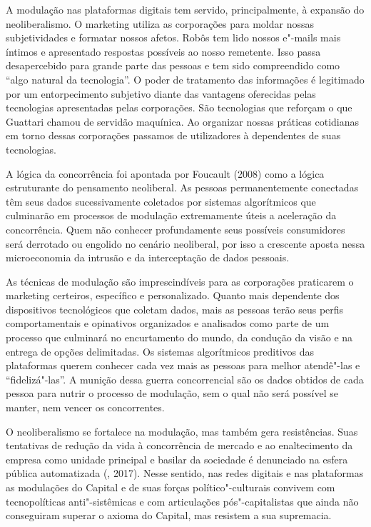 A modulação nas plataformas digitais tem servido, principalmente, à
expansão do neoliberalismo. O marketing utiliza as corporações para
moldar nossas subjetividades e formatar nossos afetos. Robôs tem lido
nossos e"-mails mais íntimos e apresentado respostas possíveis ao nosso
remetente. Isso passa desapercebido para grande parte das pessoas e tem
sido compreendido como ``algo natural da tecnologia''. O poder de
tratamento das informações é legitimado por um entorpecimento subjetivo
diante das vantagens oferecidas pelas tecnologias apresentadas pelas
corporações. São tecnologias que reforçam o que Guattari chamou de
servidão maquínica. Ao organizar nossas práticas cotidianas em torno
dessas corporações passamos de utilizadores à dependentes de suas
tecnologias.

A lógica da concorrência foi apontada por Foucault (2008) como a lógica
estruturante do pensamento neoliberal. As pessoas permanentemente
conectadas têm seus dados sucessivamente coletados por sistemas
algorítmicos que culminarão em processos de modulação extremamente úteis
a aceleração da concorrência. Quem não conhecer profundamente seus
possíveis consumidores será derrotado ou engolido no cenário neoliberal,
por isso a crescente aposta nessa microeconomia da intrusão e da
interceptação de dados pessoais.

As técnicas de modulação são imprescindíveis para as corporações
praticarem o marketing certeiros, específico e personalizado. Quanto
mais dependente dos dispositivos tecnológicos que coletam dados, mais as
pessoas terão seus perfis comportamentais e opinativos organizados e
analisados como parte de um processo que culminará no encurtamento do
mundo, da condução da visão e na entrega de opções delimitadas. Os
sistemas algorítmicos preditivos das plataformas querem conhecer cada
vez mais as pessoas para melhor atendê"-las e ``fidelizá"-las''. A munição
dessa guerra concorrencial são os dados obtidos de cada pessoa para
nutrir o processo de modulação, sem o qual não será possível se manter,
nem vencer os concorrentes.

O neoliberalismo se fortalece na modulação, mas também gera
resistências. Suas tentativas de redução da vida à concorrência de
mercado e ao enaltecimento da empresa como unidade principal e basilar
da sociedade é denunciado na esfera pública automatizada (,
2017). Nesse sentido, nas redes digitais e nas plataformas as modulações
do Capital e de suas forças político"-culturais convivem com
tecnopolíticas anti"-sistêmicas e com articulações pós"-capitalistas que
ainda não conseguiram superar o axioma do Capital, mas resistem a sua
supremacia.

